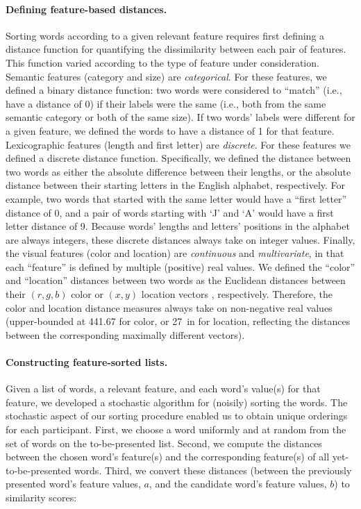 \documentclass[11pt]{article}
\providecommand{\DIFaddtex}[1]{{\protect\color{blue}\uwave{#1}}} %
\providecommand{\DIFaddbegin}{} %
\providecommand{\DIFaddend}{} %
\providecommand{\DIFadd}[1]{\texorpdfstring{\DIFaddtex{#1}}{#1}} %
\newcommand{\DIFaddincludegraphics}[2][]{{\color{blue}\fbox{\DIFOincludegraphics[#1]{#2}}}} %
\DeclareRobustCommand{\DIFaddbegin}{\DIFOaddbegin \let\includegraphics\DIFaddincludegraphics} %
\DeclareRobustCommand{\DIFaddend}{\DIFOaddend \let\includegraphics\DIFOincludegraphics} %
\begin{document}
\paragraph{Defining feature-based distances.} Sorting words according to a
given relevant feature requires first defining a distance function for
quantifying the dissimilarity between each pair of features. This function
varied according to the type of feature under consideration. Semantic features
(category and size) are \textit{categorical}. For these features, we defined a
binary distance function: two words were considered to ``match'' (i.e., have a
distance of 0) if their labels were the same (i.e., both from the same semantic
category or both of the same size). If two words' labels were different for a
given feature, we defined the words to have a distance of 1 for that feature.
Lexicographic features (length and first letter) are \textit{discrete}. For
these features we defined a discrete distance function. Specifically, we
defined the distance between two words as either the absolute difference
between their lengths, or the absolute distance between their starting letters
in the English alphabet, respectively. For example, two words that started with
the same letter would have a ``first letter'' distance of 0, and a pair of
words starting with `J' and `A' would have a first letter distance of 9.
Because words' lengths and letters' positions in the alphabet are always
integers, these discrete distances always take on integer values. Finally, the
visual features (color and location) are \textit{continuous} and
\textit{multivariate}, in that each ``feature'' is defined by multiple
(positive) real values. We defined the ``color'' and ``location'' distances
between two words as the Euclidean distances between their $(r, g, b)$ color or
$(x, y)$ location vectors \DIFaddbegin \DIFadd{(specified in inches)}\DIFaddend , respectively. Therefore, the
color and location distance measures always take on non-negative real values
(upper-bounded at 441.67 for color, or 27~in for location, reflecting the
distances between the corresponding maximally different vectors).

\paragraph{Constructing feature-sorted lists.} Given a list of words, a
relevant feature, and each word's value(s) for that feature, we developed a
stochastic algorithm for (noisily) sorting the words. The stochastic aspect of
our sorting procedure enabled us to obtain unique orderings for each
participant. First, we choose a word uniformly and at random from the set of
words on the to-be-presented list. Second, we compute the distances between the
chosen word's feature(s) and the corresponding feature(s) of all
yet-to-be-presented words. Third, we convert these distances (between the
previously presented word's feature values, $a$, and the candidate word's
feature values, $b$) to similarity scores:
\end{document}
